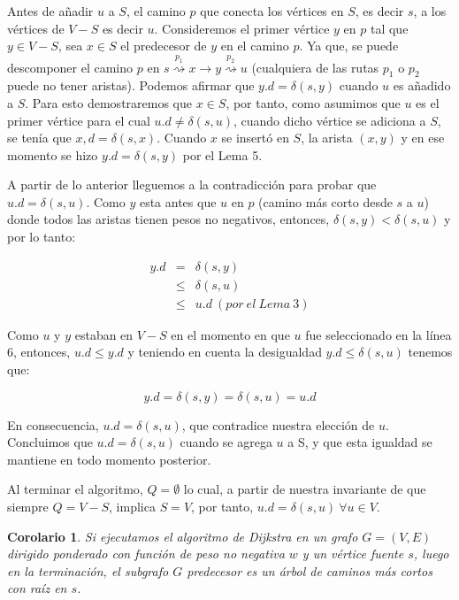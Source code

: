 \documentclass[12pt]{article}
\newcommand{\nl}{\vspace{0.3cm}}
\newtheorem{corollary}{Corolario}
\begin{document}
Antes de añadir $u$ a $S$, el camino $p$ que conecta los vértices en $S$, es decir $s$, a los vértices de $V - S$ es decir $u$. Consideremos el primer vértice $y$ en $p$ tal que $y \in V - S$, sea $x \in S$ el predecesor de $y$ en el camino $p$. Ya que, se puede descomponer el camino $p$ en $ s \stackrel{p_1}{\rightsquigarrow} x \rightarrow y \stackrel{p_2}{\rightsquigarrow} u $ (cualquiera de las rutas $p_1$ o $p_2$ puede no tener aristas). Podemos afirmar que $ y.d = \delta(s, y) $ cuando $u$ es añadido a $S$. Para esto demostraremos que $x \in S$, por tanto, como asumimos que $u$ es el primer vértice para el cual $u.d \neq \delta(s, u)$, cuando dicho vértice se adiciona a $S$, se tenía que $x,d = \delta(s, x)$. Cuando $x$ se insertó en $S$, la arista $(x, y)$ y en ese momento se hizo $y.d = \delta(s, y)$ por el Lema 5.

\nl

A partir de lo anterior lleguemos a la contradicción para probar que $u.d = \delta(s, u)$. Como $y$ esta antes que $u$ en $p$ (camino más corto desde $s$ a $u$) donde todos las aristas tienen pesos no negativos, entonces, $\delta(s, y) < \delta(s, u)$ y por lo tanto:

\begin{eqnarray*}
	y.d & = & \delta(s, y) \\
	& \leqslant & \delta(s, u) \\
	& \leqslant & u.d \ (por\ el\ Lema\ 3)
\end{eqnarray*}

Como $u$ y $y$ estaban en $V - S$ en el momento en que $u$ fue seleccionado en la línea 6, entonces,  $u.d \leqslant y.d$ y teniendo en cuenta la desigualdad $y.d \leqslant \delta(s, u)$ tenemos que:

$$ y.d = \delta(s, y) = \delta(s, u) = u.d $$

En consecuencia, $u.d = \delta(s, u)$, que contradice nuestra elección de $u$. Concluimos que $u.d = \delta(s, u)$ cuando se agrega $u$ a S, y que esta igualdad se mantiene en todo momento posterior.

\nl

Al terminar el algoritmo, $Q = \emptyset$ lo cual, a partir de nuestra invariante de que siempre $Q = V - S$, implica $S = V$, por tanto, $u.d = \delta(s, u) \ \forall u \in V$.

\begin{corollary}
	Si ejecutamos el algoritmo de Dijkstra en un grafo $G = (V,E) $ dirigido ponderado con función de peso no negativa $w$ y un vértice fuente $s$, luego en la terminación, el subgrafo $G$ predecesor es un árbol de caminos más cortos con raíz en $s$.
\end{corollary}
\end{document}
